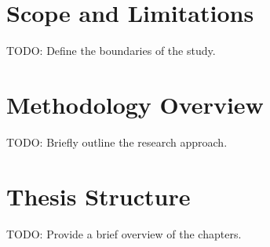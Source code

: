 \section{Scope and Limitations}
TODO: Define the boundaries of the study. \cite{nanPolyFitPolygonalSurface2017}

\section{Methodology Overview}
TODO: Briefly outline the research approach. \cite{wangApplicationOrientedScantoBIM2019}

\section{Thesis Structure}
TODO: Provide a brief overview of the chapters.

